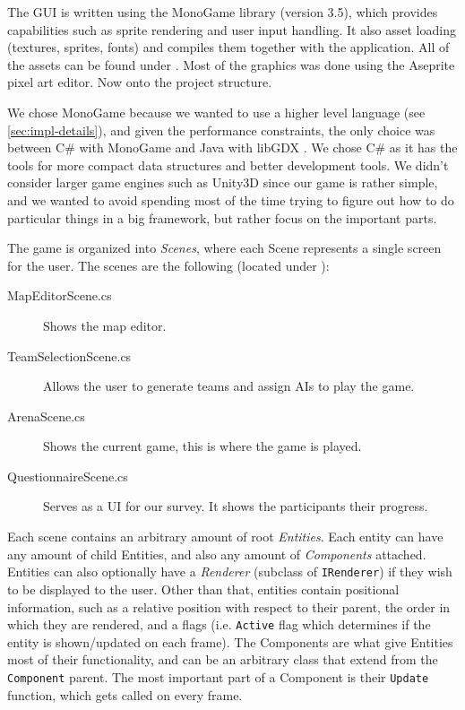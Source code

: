 
The GUI is written using the MonoGame \citep{monogame} library (version 3.5), which provides capabilities such as sprite rendering and user input handling. It also asset loading (textures, sprites, fonts) and compiles them together with the application. All of the assets can be found under . Most of the graphics was done using the Aseprite \citep{aseprite} pixel art editor. Now onto the project structure.

We chose MonoGame because we wanted to use a higher level language (see \autoref{sec:impl-details}), and given the performance constraints, the only choice was between C\# with MonoGame and Java with libGDX \citep{libgdx}. We chose C\# as it has the tools for more compact data structures and better development tools. We didn't consider larger game engines such as Unity3D \citep{unity3d} since our game is rather simple, and we wanted to avoid spending most of the time trying to figure out how to do particular things in a big framework, but rather focus on the important parts.

The game is organized into \emph{Scenes}, where each Scene represents a single screen for the user. The scenes are the following (located under ):

\begin{description}
	\item[MapEditorScene.cs] Shows the map editor.
	\item[TeamSelectionScene.cs] Allows the user to generate teams and assign AIs to play the game.
	\item[ArenaScene.cs] Shows the current game, this is where the game is played.
	\item[QuestionnaireScene.cs] Serves as a UI for our survey. It shows the participants their progress.
\end{description}

Each scene contains an arbitrary amount of root \emph{Entities}. Each entity can have any amount of child Entities, and also any amount of \emph{Components} attached. Entities can also optionally have a \emph{Renderer} (subclass of \verb|IRenderer|) if they wish to be displayed to the user. Other than that, entities contain positional information, such as a relative position with respect to their parent, the order in which they are rendered, and a flags (i.e. \verb|Active| flag which determines if the entity is shown/updated on each frame). The Components are what give Entities most of their functionality, and can be an arbitrary class that extend from the \verb|Component| parent. The most important part of a Component is their \verb|Update| function, which gets called on every frame.

